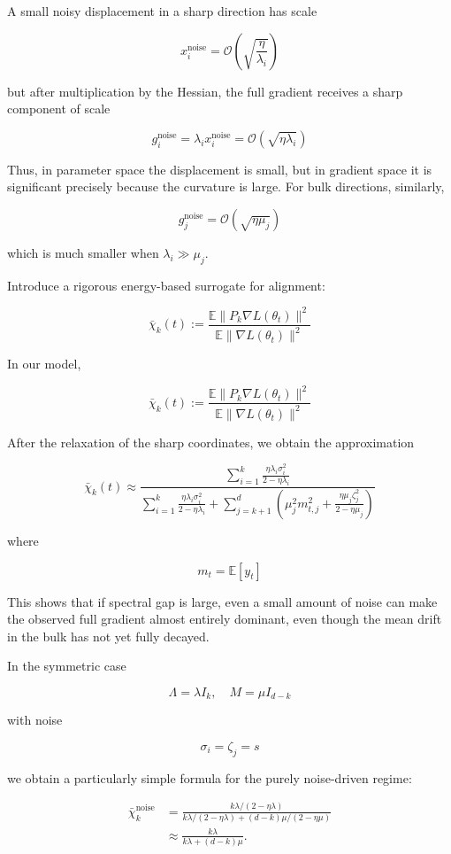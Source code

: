\documentclass[conference]{IEEEtran}
\begin{document}
A small noisy displacement in a sharp direction has scale

\[
x_i^{\text{noise}} = \mathcal{O}\left(\sqrt{\frac{\eta}{\lambda_i}}\right)
\]

but after multiplication by the Hessian, the full gradient receives a sharp component of scale

\[
g_i^{\text{noise}} = \lambda_ix_i^{\text{noise}} = \mathcal{O}\left(\sqrt{\eta \lambda_i}\right)
\]

Thus, in parameter space the displacement is small, but in gradient space it is significant precisely because the curvature is large. For bulk directions, similarly,

\[
g_j^{\text{noise}} = \mathcal{O}\left(\sqrt{\eta \mu_j}\right)
\]

which is much smaller when $\lambda_i \gg \mu_j$.

Introduce a rigorous energy-based surrogate for alignment:

\[
\bar \chi_k(t):= \frac{\mathbb{E}\|P_k\nabla L(\theta_t)\|^2}{\mathbb{E}\|\nabla L(\theta_t)\|^2}
\]

In our model,

\[
\bar \chi_k(t):= \frac{\mathbb{E}\|P_k\nabla L(\theta_t)\|^2}{\mathbb{E}\|\nabla L(\theta_t)\|^2}
\]

After the relaxation of the sharp coordinates, we obtain the approximation

\[
\bar \chi_k(t)\approx\frac{\sum_{i=1}^k \frac{\eta\lambda_i\sigma_i^2}{2-\eta\lambda_i}}{\sum_{i=1}^k \frac{\eta\lambda_i\sigma_i^2}{2-\eta\lambda_i} + \sum_{j=k+1}^d \left(\mu_j^2m_{t,j}^2+\frac{\eta\mu_j\zeta_j^2}{2-\eta\mu_j}\right)}
\]

where

\[
m_t = \mathbb{E}[y_t]
\]

This shows that if spectral gap is large, even a small amount of noise can make the observed full gradient almost entirely dominant, even though the mean drift in the bulk has not yet fully decayed.

In the symmetric case

\[
\Lambda = \lambda I_k,\quad M=\mu I_{d-k}
\]

with noise

\[
\sigma_i = \zeta_j = s
\]

we obtain a particularly simple formula for the purely noise-driven regime:

\[
\begin{aligned}
\bar \chi_k^\text{noise}
&=
\frac{k\lambda / (2-\eta\lambda)}
{k\lambda/(2-\eta\lambda) + (d-k)\mu/(2-\eta\mu)} \\
&\approx
\frac{k\lambda}{k\lambda + (d-k)\mu}.
\end{aligned}
\]
\end{document}
